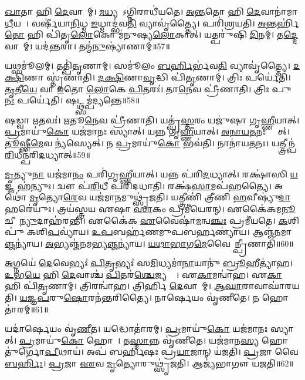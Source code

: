 \ul{𑌖𑌾}𑌤𑌾 𑌹𑌿 \ul{𑌦𑍇}𑌵𑌾𑌨𑌾᳚𑌮𑍍।
\ul{𑌮}\ul{𑌧𑍍𑌯}𑌤𑍋᳚\-𑌽𑌗𑍍𑌨𑌿𑌰𑌾𑌧𑍀॑𑌯𑌤𑍇।
\ul{𑌅}\ul{𑌨𑍍𑌤}𑌤𑍋 𑌹𑌿 \ul{𑌦𑍇}𑌵𑌾𑌨𑌾॑𑌮𑌾\ul{𑌧𑍀}𑌯𑌤𑍇᳚।
𑌵𑌰𑍍\mbox{}𑌷𑍀॑𑌯𑌾\ul{𑌨𑌿}𑌧𑍍𑌮 \ul{𑌇}𑌧𑍍𑌮𑌾𑌦𑍍𑌭॑𑌵\ul{𑌤𑌿} 𑌵𑍍𑌯𑌾𑌵𑍃॑𑌤𑍍𑌤𑍍𑌯𑍈।
𑌪𑌰𑌿॑𑌶𑍍𑌰𑌯𑌤𑌿।
\ul{𑌅}𑌨𑍍𑌤𑌰𑍍\mbox{}𑌹𑌿॑\ul{𑌤𑍋} 𑌹𑌿 𑌪𑌿॑𑌤𑍃\ul{𑌲𑍋}𑌕𑍋 𑌮॑𑌨𑍁𑌷𑍍𑌯\ul{𑌲𑍋}𑌕𑌾𑌤𑍍।
𑌯𑌤𑍍𑌪𑌰𑍁॑𑌷𑌿 \ul{𑌦𑌿}𑌨𑌮𑍍।
𑌤\ul{𑌦𑍍𑌦𑍇}𑌵𑌾𑌨𑌾᳚𑌮𑍍।
𑌯𑌦॑\ul{𑌨𑍍𑌤}𑌰𑌾।
𑌤𑌨𑍍𑌮॑\ul{𑌨𑍁}𑌷𑍍𑌯𑌾॑𑌣𑌾𑌮𑍍॥57॥

𑌯𑌥𑍍𑌸𑌮𑍂॑𑌲𑌮𑍍।
𑌤𑌤𑍍𑌪𑌿॑\ul{𑌤𑍃}𑌣𑌾𑌮𑍍।
𑌸𑌮𑍂॑𑌲𑌂 \ul{𑌬}\ul{𑌰𑍍}𑌹𑌿𑌰𑍍𑌭॑𑌵\ul{𑌤𑌿} 𑌵𑍍𑌯𑌾𑌵𑍃॑𑌤𑍍𑌤𑍍𑌯𑍈।
\ul{𑌦}\ul{𑌕𑍍𑌷𑌿}𑌣𑌾 𑌸𑍍𑌤𑍃॑𑌣𑌾𑌤𑌿।
\ul{𑌦}\ul{𑌕𑍍𑌷𑌿}𑌣𑌾\ul{𑌵𑍃}𑌦𑍍𑌧𑌿 𑌪𑌿॑\ul{𑌤𑍃}𑌣𑌾𑌮𑍍।
𑌤𑍍𑌰𑌿𑌃 𑌪𑌰𑍍𑌯𑍇॑𑌤𑌿।
\ul{𑌤𑍃}𑌤𑍀\ul{𑌯𑍇} 𑌵𑌾 \ul{𑌇}𑌤𑍋 \ul{𑌲𑍋}𑌕𑍇 \ul{𑌪𑌿}𑌤𑌰𑌃॑।
𑌤𑌾\ul{𑌨𑍇}𑌵 𑌪𑍍𑌰𑍀॑𑌣𑌾𑌤𑌿।
𑌤𑍍𑌰𑌿𑌃 𑌪𑍁\ul{𑌨𑌃} 𑌪𑌰𑍍𑌯𑍇॑𑌤𑌿।
𑌷𑌟𑍍𑌥𑍍𑌸𑌮𑍍𑌪॑𑌦𑍍𑌯𑌨𑍍𑌤𑍇॥58॥

𑌷𑌡𑍍𑌵𑌾 \ul{𑌋}𑌤𑌵𑌃॑।
\ul{𑌋}𑌤𑍂\ul{𑌨𑍇}𑌵 𑌪𑍍𑌰𑍀॑𑌣𑌾𑌤𑌿।
𑌯𑌤𑍍𑌪𑍍𑌰॑\ul{𑌸𑍍𑌤}𑌰𑌂 𑌯𑌜𑍁॑𑌷𑌾 𑌗𑍃\ul{𑌹𑍍𑌣𑍀}𑌯𑌾𑌤𑍍।
\ul{𑌪𑍍𑌰}𑌮𑌾𑌯𑍁॑\ul{𑌕𑍋} 𑌯𑌜॑𑌮𑌾𑌨𑌃 𑌸𑍍𑌯𑌾𑌤𑍍।
𑌯𑌨𑍍𑌨 𑌗𑍃॑\ul{𑌹𑍍𑌣𑍀}𑌯𑌾𑌤𑍍।
\ul{𑌅}\ul{𑌨𑌾}\ul{𑌯}\ul{𑌤}𑌨𑌃 𑌸𑍍𑌯𑌾᳚𑌤𑍍।
\ul{𑌤𑍂}𑌷𑍍𑌣𑍀\ul{𑌮𑍇}𑌵 𑌨𑍍𑌯॑𑌸𑍍𑌯𑍇𑌤𑍍।
𑌨 \ul{𑌪𑍍𑌰}𑌮𑌾𑌯𑍁॑\ul{𑌕𑍋} 𑌭𑌵॑𑌤𑌿।
𑌨𑌾𑌨𑌾॑𑌯\ul{𑌤}𑌨𑌃।
𑌯𑌤𑍍𑌤𑍍𑌰𑍀𑌨𑍍𑌪॑\ul{𑌰𑌿}𑌧𑍀𑌨𑍍𑌪॑𑌰𑌿\ul{𑌦}𑌧𑍍𑌯𑌾𑌤𑍍॥59॥

\ul{𑌮𑍃}𑌤𑍍𑌯𑍁\ul{𑌨𑌾} 𑌯𑌜॑𑌮𑌾\ul{𑌨𑌂} 𑌪𑌰𑌿॑𑌗𑍃𑌹𑍍𑌣𑍀𑌯𑌾𑌤𑍍।
𑌯𑌨𑍍𑌨 𑌪॑𑌰𑌿\ul{𑌦}𑌧𑍍𑌯𑌾𑌤𑍍।
𑌰𑌕𑍍𑌷𑌾॑𑌸𑌿 \ul{𑌯}𑌜𑍍𑌞 𑌹॑𑌨𑍍𑌯𑍁𑌃।
𑌦𑍍𑌵𑍗 𑌪॑\ul{𑌰𑌿}𑌧𑍀 𑌪𑌰𑌿॑𑌦𑌧𑌾𑌤𑌿।
𑌰𑌕𑍍𑌷॑\ul{𑌸𑌾}𑌮𑌪॑𑌹𑌤𑍍𑌯𑍈।
𑌅𑌥𑍋॑ \ul{𑌮𑍃}𑌤𑍍𑌯𑍋\ul{𑌰𑍇}𑌵 𑌯𑌜॑𑌮𑌾\ul{𑌨}𑌮𑍁𑌥𑍍𑌸𑍃॑𑌜𑌤𑌿।
𑌯𑌤𑍍𑌤𑍍𑌰𑍀𑌣𑌿॑ 𑌤𑍍𑌰𑍀𑌣𑌿 \ul{𑌹}𑌵𑍀𑌷𑍍𑌯𑍁॑\ul{𑌦𑌾}𑌹𑌰𑍇॑𑌯𑍁𑌃।
𑌤𑍍𑌰𑌯॑𑌸𑍍𑌤𑍍𑌰𑌯 𑌏𑌷𑌾 \ul{𑌸𑌾}𑌕𑌂 𑌪𑍍𑌰𑌮𑍀॑𑌯𑍇𑌰𑌨𑍍।
𑌏𑌕𑍈॑𑌕𑌮\ul{𑌨𑍂}𑌚𑍀𑌨𑌾᳚\ul{𑌨𑍍𑌯𑍁}𑌦𑌾𑌹॑𑌰𑌨𑍍𑌤𑌿।
𑌏𑌕𑍈॑𑌕 \ul{𑌏}𑌵𑍈𑌷𑌾॑\ul{𑌮}𑌨𑍍𑌵\ul{𑌞𑍍𑌚𑌃} 𑌪𑍍𑌰𑌮𑍀॑𑌯𑌤𑍇।
\ul{𑌕}𑌶𑌿𑌪𑍁॑ 𑌕𑌶𑌿\ul{𑌪}𑌵𑍍𑌯𑌾॑𑌯।
\ul{𑌉}\ul{𑌪}𑌬𑌰𑍍\mbox{}𑌹॑𑌣𑌮𑍁𑌪𑌬𑌰𑍍\mbox{}\ul{𑌹}𑌣𑍍𑌯𑌾॑𑌯।
𑌆𑌞𑍍𑌜॑𑌨𑌮𑌾\ul{𑌞𑍍𑌜}𑌨𑍍𑌯𑌾॑𑌯।
\ul{𑌅}𑌭𑍍𑌯𑌞𑍍𑌜॑𑌨𑌮𑌭𑍍𑌯\ul{𑌞𑍍𑌜}𑌨𑍍𑌯𑌾॑𑌯।
\ul{𑌯}\ul{𑌥𑌾}\ul{𑌭𑌾}𑌗\ul{𑌮𑍇}\-𑌵𑍈𑌨𑌾᳚𑌨𑍍𑌪𑍍𑌰𑍀𑌣𑌾𑌤𑌿॥60॥

\ul{𑌅}𑌗𑍍𑌨𑌯𑍇॑ \ul{𑌦𑍇}𑌵𑍇𑌭𑍍𑌯𑌃॑ \ul{𑌪𑌿}𑌤𑍃𑌭𑍍𑌯𑌃॑ 𑌸\ul{𑌮𑌿}𑌧𑍍𑌯𑌮𑌾॑\ul{𑌨𑌾}𑌯𑌾𑌨𑍁॑ \ul{𑌬𑍍𑌰𑍂}𑌹𑍀𑌤𑍍𑌯𑌾॑𑌹।
\ul{𑌉}𑌭\ul{𑌯𑍇} 𑌹𑌿 \ul{𑌦𑍇}𑌵𑌾𑌶𑍍𑌚॑ \ul{𑌪𑌿}𑌤𑌰॑\ul{𑌶𑍍𑌚𑍇}𑌜𑍍𑌯𑌨𑍍𑌤𑍇᳚।
𑌏\ul{𑌕𑌾}𑌮𑌨𑍍𑌵𑌾॑𑌹।
𑌏\ul{𑌕𑌾} 𑌹𑌿 𑌪𑌿॑\ul{𑌤𑍃}𑌣𑌾𑌮𑍍।
𑌤𑍍𑌰𑌿𑌰𑌨𑍍𑌵𑌾॑𑌹।
𑌤𑍍𑌰𑌿𑌰𑍍\mbox{}𑌹𑌿 \ul{𑌦𑍇}𑌵𑌾𑌨𑌾᳚𑌮𑍍।
\ul{𑌆}\ul{𑌘𑌾}𑌰𑌾𑌵𑌾𑌘𑌾॑𑌰𑌯𑌤𑌿।
\ul{𑌯}\ul{𑌜𑍍𑌞}\ul{𑌪}𑌰𑍁\ul{𑌷𑍋}𑌰𑌨॑𑌨𑍍𑌤𑌰𑌿𑌤𑍍𑌯𑍈।
𑌨𑌾𑌰𑍍\mbox{}\ul{𑌷𑍇}𑌯𑌂 𑌵𑍃॑𑌣𑍀𑌤𑍇।
𑌨 𑌹𑍋𑌤𑌾॑𑌰𑌮𑍍॥61॥

𑌯𑌦𑌾॑𑌰𑍍\mbox{}\ul{𑌷𑍇}𑌯𑌂 𑌵𑍃॑\ul{𑌣𑍀}𑌤।
𑌯𑌦𑍍𑌧𑍋𑌤𑌾॑𑌰𑌮𑍍।
\ul{𑌪𑍍𑌰}𑌮𑌾𑌯𑍁॑\ul{𑌕𑍋} 𑌯𑌜॑𑌮𑌾𑌨𑌃 𑌸𑍍𑌯𑌾𑌤𑍍।
\ul{𑌪𑍍𑌰}𑌮𑌾𑌯𑍁॑\ul{𑌕𑍋} 𑌹𑍋𑌤𑌾᳚।
𑌤\ul{𑌸𑍍𑌮𑌾}𑌨𑍍𑌨 𑌵𑍃॑𑌣𑍀𑌤𑍇।
𑌯𑌜॑𑌮𑌾𑌨\ul{𑌸𑍍𑌯} 𑌹𑍋𑌤𑍁॑𑌰𑍍𑌗𑍋\ul{𑌪𑍀}𑌥𑌾𑌯॑।
𑌅𑌪॑ 𑌬𑌰𑍍\mbox{}𑌹𑌿𑌷𑌃 𑌪𑍍𑌰\ul{𑌯𑌾}𑌜𑌾𑌨𑍍 𑌯॑𑌜𑌤𑌿।
\ul{𑌪𑍍𑌰}𑌜𑌾 𑌵𑍈 \ul{𑌬}\ul{𑌰𑍍}𑌹𑌿𑌃।
\ul{𑌪𑍍𑌰}𑌜𑌾 \ul{𑌏}𑌵 \ul{𑌮𑍃}𑌤𑍍𑌯𑍋𑌰𑍁𑌥𑍍𑌸𑍃॑𑌜𑌤𑌿।
𑌆𑌜𑍍𑌯॑𑌭𑌾𑌗𑍗 𑌯𑌜𑌤𑌿॥62॥

